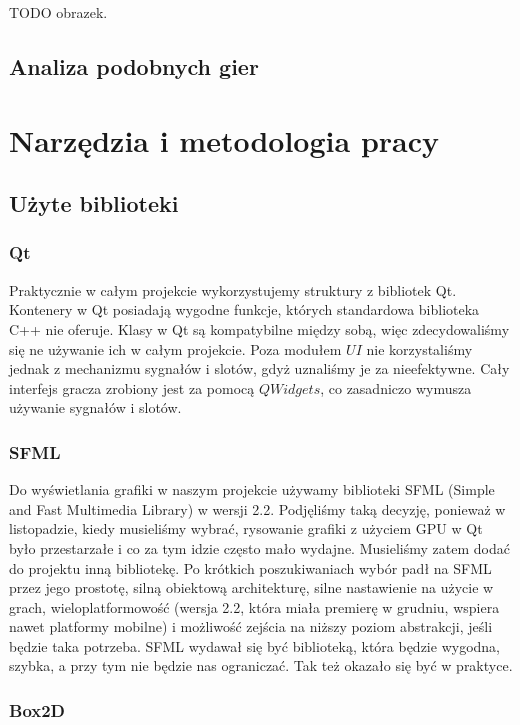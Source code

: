 \documentclass[licencjacka]{pracamgr}
\begin{document}
    TODO obrazek.

  \section{Analiza podobnych gier}

\chapter{Narzędzia i metodologia pracy}
  \section{Użyte biblioteki}
    \subsection{Qt}
    Praktycznie w całym projekcie wykorzystujemy struktury z bibliotek Qt. Kontenery w Qt posiadają wygodne funkcje,
    których standardowa biblioteka C++ nie oferuje. Klasy w Qt są kompatybilne między sobą, więc zdecydowaliśmy się ne
    używanie ich w całym projekcie. Poza modułem $UI$ nie korzystaliśmy jednak z mechanizmu sygnałów i slotów, gdyż
    uznaliśmy je za nieefektywne. Cały interfejs gracza zrobiony jest za pomocą $QWidgets$, co zasadniczo wymusza
    używanie sygnałów i slotów.

    \subsection{SFML}
    Do wyświetlania grafiki w naszym projekcie używamy biblioteki SFML (Simple and Fast Multimedia Library) w wersji
    2.2. Podjęliśmy taką decyzję, ponieważ w listopadzie, kiedy musieliśmy wybrać, rysowanie grafiki z użyciem GPU w Qt
    było przestarzałe i co za tym idzie często mało wydajne. Musieliśmy zatem dodać do projektu inną bibliotekę. Po
    krótkich poszukiwaniach wybór padł na SFML przez jego prostotę, silną obiektową architekturę, silne nastawienie na
    użycie w grach, wieloplatformowość (wersja 2.2, która miała premierę w grudniu, wspiera nawet platformy mobilne) i
    możliwość zejścia na niższy poziom abstrakcji, jeśli będzie taka potrzeba. SFML wydawał się być biblioteką, która
    będzie wygodna, szybka, a przy tym nie będzie nas ograniczać. Tak też okazało się być w praktyce.

    \subsection{Box2D}
\end{document}
